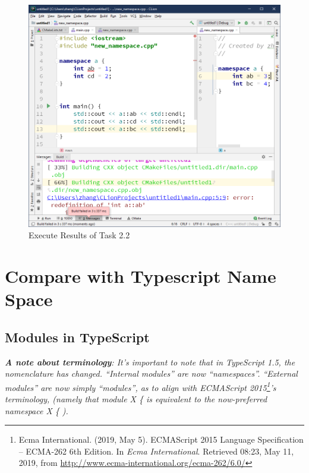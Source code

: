 \documentclass[a4paper]{report}
\begin{document}
\begin{figure}
  \centering
  \includegraphics[scale=0.5]{TwoTwo.PNG}
  \caption{Execute Results of Task 2.2}\label{5}
\end{figure}

\chapter{Compare with Typescript Name Space}

\section{Modules in TypeScript}
\emph{\textbf{A note about terminology}: It’s important to note that in TypeScript 1.5, the nomenclature has changed. ``Internal modules'' are now ``namespaces''. ``External modules'' are now simply ``modules'', as to align with ECMAScript 2015\footnote{Ecma International. (2019, May 5). ECMAScript 2015 Language Specification – ECMA-262 6th Edition. In \emph{Ecma International}. Retrieved 08:23, May 11, 2019, from \url{http://www.ecma-international.org/ecma-262/6.0/}}'s terminology, (namely that \textcolor[rgb]{0.749,0.255,0.29}{module X \{ } is equivalent to the now-preferred \textcolor[rgb]{0.749,0.255,0.29}{namespace X \{} ).}
\end{document}
